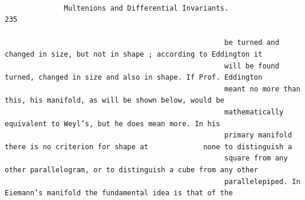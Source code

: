 \documentclass[10pt]{article}
\begin{document}
\begin{verbatim}

              Multenions and Differential Invariants.                235

                                                    be turned and changed in size, but not in shape ; according to Eddington it
                                                    will be found turned, changed in size and also in shape. If Prof. Eddington
                                                    meant no more than this, his manifold, as will be shown below, would be
                                                    mathematically equivalent to Weyl’s, but he does mean more. In his
                                                    primary manifold there is no criterion for shape at             none to distinguish a
                                                    square from any other parallelogram, or to distinguish a cube from any other
                                                    parallelepiped. In Eiemann’s manifold the fundamental idea is that of the





\end{verbatim}
\end{document}
